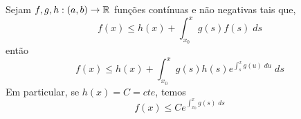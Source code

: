 \begin{lemma}[Gronwall]
    \label{lemmaGronwall}
    Sejam $f,g,h:(a,b)\to\mathbb{R}$ funções contínuas e não negativas tais que,
    \begin{equation}
        \label{hipoteseGronwall}
        f(x) \leq h(x) + \int_{x_0}^x g(s)f(s) \; ds
    \end{equation}
    então
    \begin{equation}
        f(x) \leq h(x) + \int_{x_0}^x g(s)h(s)e^{\int_s^x g(u)\; du} \; ds
    \end{equation}
    Em particular, se $h(x)=C=cte$, temos
    \begin{equation}
        \label{resultadoGronwall}
        f(x) \leq Ce^{\int_{x_0}^x g(s)\; ds}
    \end{equation}
\end{lemma}
